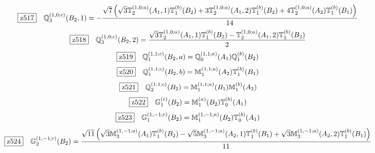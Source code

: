 \documentclass[fleqn,10pt,landscape]{jsarticle}
\begin{document}
\begin{dmath*}
\hspace*{3mm}\fbox{z517}\quad \mathbb{Q}_{3}^{(1,0;c)}(B_{2},1)=- \frac{\sqrt{7} \left(\sqrt{3} \mathbb{T}_{2}^{(1,0;a)}(A_{1},1) \mathbb{T}_{1}^{(b)}(B_{2}) + 3 \mathbb{T}_{2}^{(1,0;a)}(A_{1},2) \mathbb{T}_{1}^{(b)}(B_{2}) + 4 \mathbb{T}_{2}^{(1,0;a)}(A_{2}) \mathbb{T}_{1}^{(b)}(B_{1})\right)}{14}
\end{dmath*}
\begin{dmath*}
\hspace*{3mm}\fbox{z518}\quad \mathbb{Q}_{3}^{(1,0;c)}(B_{2},2)=\frac{\sqrt{3} \mathbb{T}_{2}^{(1,0;a)}(A_{1},1) \mathbb{T}_{1}^{(b)}(B_{2}) - \mathbb{T}_{2}^{(1,0;a)}(A_{1},2) \mathbb{T}_{1}^{(b)}(B_{2})}{2}
\end{dmath*}
\begin{dmath*}
\hspace*{3mm}\fbox{z519}\quad \mathbb{Q}_{1}^{(1,1;c)}(B_{2},a)=\mathbb{Q}_{0}^{(1,1;a)}(A_{1}) \mathbb{Q}_{1}^{(b)}(B_{2})
\end{dmath*}
\begin{dmath*}
\hspace*{3mm}\fbox{z520}\quad \mathbb{Q}_{1}^{(1,1;c)}(B_{2},b)=\mathbb{M}_{1}^{(1,1;a)}(A_{2}) \mathbb{T}_{1}^{(b)}(B_{1})
\end{dmath*}
\begin{dmath*}
\hspace*{3mm}\fbox{z521}\quad \mathbb{Q}_{2}^{(1,1;c)}(B_{2})=\mathbb{M}_{1}^{(1,1;a)}(B_{1}) \mathbb{M}_{1}^{(b)}(A_{2})
\end{dmath*}
\begin{dmath*}
\hspace*{3mm}\fbox{z522}\quad \mathbb{G}_{1}^{(c)}(B_{2})=\mathbb{M}_{1}^{(a)}(B_{2}) \mathbb{T}_{0}^{(b)}(A_{1})
\end{dmath*}
\begin{dmath*}
\hspace*{3mm}\fbox{z523}\quad \mathbb{G}_{1}^{(1,-1;c)}(B_{2})=\mathbb{M}_{1}^{(1,-1;a)}(B_{2}) \mathbb{T}_{0}^{(b)}(A_{1})
\end{dmath*}
\begin{dmath*}
\hspace*{3mm}\fbox{z524}\quad \mathbb{G}_{2}^{(1,-1;c)}(B_{2})=\frac{\sqrt{11} \left(\sqrt{3} \mathbb{M}_{3}^{(1,-1;a)}(A_{1}) \mathbb{T}_{1}^{(b)}(B_{2}) - \sqrt{5} \mathbb{M}_{3}^{(1,-1;a)}(A_{2},1) \mathbb{T}_{1}^{(b)}(B_{1}) + \sqrt{3} \mathbb{M}_{3}^{(1,-1;a)}(A_{2},2) \mathbb{T}_{1}^{(b)}(B_{1})\right)}{11}
\end{dmath*}
\end{document}
